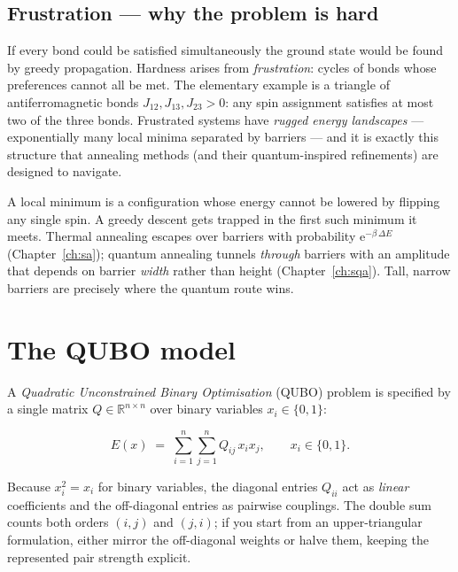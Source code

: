 \subsection{Frustration --- why the problem is hard}

If every bond could be satisfied simultaneously the ground state would be
found by greedy propagation. Hardness arises from \emph{frustration}:
cycles of bonds whose preferences cannot all be met. The elementary example
is a triangle of antiferromagnetic bonds $J_{12},J_{13},J_{23}>0$: any spin
assignment satisfies at most two of the three bonds. Frustrated systems have
\emph{rugged energy landscapes} --- exponentially many local minima separated
by barriers --- and it is exactly this structure that annealing methods (and
their quantum-inspired refinements) are designed to navigate.

\begin{physbox}
A local minimum is a configuration whose energy cannot be lowered by flipping
any single spin. A greedy descent gets trapped in the first such minimum it
meets. Thermal annealing escapes over barriers with probability
$\mathrm{e}^{-\beta\,\Delta E}$ (Chapter~\ref{ch:sa}); quantum annealing
tunnels \emph{through} barriers with an amplitude that depends on barrier
\emph{width} rather than height (Chapter~\ref{ch:sqa}). Tall, narrow barriers
are precisely where the quantum route wins.
\end{physbox}

\section{The QUBO model}
\label{sec:qubo}

A \emph{Quadratic Unconstrained Binary Optimisation} (QUBO) problem is
specified by a single matrix $Q\in\mathbb{R}^{n\times n}$ over binary
variables $x_i\in\{0,1\}$:

\begin{keyeq}
\begin{equation}
E(x) \;=\; \sum_{i=1}^{n}\sum_{j=1}^{n} Q_{ij}\, x_i x_j,
\qquad x_i\in\{0,1\}.
\label{eq:qubo}
\end{equation}
\end{keyeq}

Because $x_i^2=x_i$ for binary variables, the diagonal entries $Q_{ii}$ act
as \emph{linear} coefficients and the off-diagonal entries as pairwise
couplings. The double sum counts both orders $(i,j)$ and $(j,i)$; if you
start from an upper-triangular formulation, either mirror the off-diagonal
weights or halve them, keeping the represented pair strength explicit.

